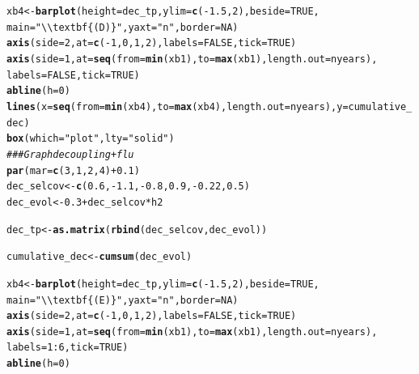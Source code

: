 \documentclass{article}\usepackage[]{graphicx}\usepackage[]{color}
\makeatletter
\newcommand{\hlnum}[1]{\textcolor[rgb]{0.686,0.059,0.569}{#1}}%
\newcommand{\hlstr}[1]{\textcolor[rgb]{0.192,0.494,0.8}{#1}}%
\newcommand{\hlcom}[1]{\textcolor[rgb]{0.678,0.584,0.686}{\textit{#1}}}%
\newcommand{\hlopt}[1]{\textcolor[rgb]{0,0,0}{#1}}%
\newcommand{\hlstd}[1]{\textcolor[rgb]{0.345,0.345,0.345}{#1}}%
\newcommand{\hlkwb}[1]{\textcolor[rgb]{0.69,0.353,0.396}{#1}}%
\newcommand{\hlkwc}[1]{\textcolor[rgb]{0.333,0.667,0.333}{#1}}%
\newcommand{\hlkwd}[1]{\textcolor[rgb]{0.737,0.353,0.396}{\textbf{#1}}}%
\newenvironment{kframe}{%
 \def\at@end@of@kframe{}%
 \ifinner\ifhmode%
  \def\at@end@of@kframe{\end{minipage}}%
  \begin{minipage}{\columnwidth}%
 \fi\fi%
 \def\FrameCommand##1{\hskip\@totalleftmargin \hskip-\fboxsep
 \colorbox{shadecolor}{##1}\hskip-\fboxsep
     \hskip-\linewidth \hskip-\@totalleftmargin \hskip\columnwidth}%
 \MakeFramed {\advance\hsize-\width
   \@totalleftmargin\z@ \linewidth\hsize
   \@setminipage}}%
 {\par\unskip\endMakeFramed%
 \at@end@of@kframe}
\newenvironment{knitrout}{}{} %
\makeatother
\begin{document}
\begin{knitrout}
\begin{kframe}
\begin{alltt}
\hlstd{xb4} \hlkwb{<-} \hlkwd{barplot}\hlstd{(}\hlkwc{height} \hlstd{= dec_tp,} \hlkwc{ylim} \hlstd{=} \hlkwd{c}\hlstd{(}\hlopt{-}\hlnum{1.5}\hlstd{,}\hlnum{2}\hlstd{),} \hlkwc{beside} \hlstd{=} \hlnum{TRUE}\hlstd{,}
               \hlkwc{main}\hlstd{=}\hlstr{"\textbackslash{}\textbackslash{}textbf\{(D)\}"}\hlstd{,} \hlkwc{yaxt}\hlstd{=}\hlstr{"n"}\hlstd{,} \hlkwc{border} \hlstd{=} \hlnum{NA}\hlstd{)}
\hlkwd{axis}\hlstd{(}\hlkwc{side}\hlstd{=}\hlnum{2}\hlstd{,} \hlkwc{at} \hlstd{=} \hlkwd{c}\hlstd{(}\hlopt{-}\hlnum{1}\hlstd{,}\hlnum{0}\hlstd{,}\hlnum{1}\hlstd{,}\hlnum{2}\hlstd{),} \hlkwc{labels} \hlstd{=} \hlnum{FALSE}\hlstd{,} \hlkwc{tick} \hlstd{=} \hlnum{TRUE}\hlstd{)}
\hlkwd{axis}\hlstd{(}\hlkwc{side}\hlstd{=}\hlnum{1}\hlstd{,} \hlkwc{at} \hlstd{=} \hlkwd{seq}\hlstd{(}\hlkwc{from}\hlstd{=}\hlkwd{min}\hlstd{(xb1),} \hlkwc{to}\hlstd{=}\hlkwd{max}\hlstd{(xb1),} \hlkwc{length.out} \hlstd{= nyears),}
     \hlkwc{labels} \hlstd{=} \hlnum{FALSE}\hlstd{,}\hlkwc{tick} \hlstd{=} \hlnum{TRUE}\hlstd{)}
\hlkwd{abline}\hlstd{(}\hlkwc{h}\hlstd{=}\hlnum{0}\hlstd{)}
\hlkwd{lines}\hlstd{(}\hlkwc{x}\hlstd{=}\hlkwd{seq}\hlstd{(}\hlkwc{from}\hlstd{=}\hlkwd{min}\hlstd{(xb4),} \hlkwc{to}\hlstd{=}\hlkwd{max}\hlstd{(xb4),} \hlkwc{length.out} \hlstd{= nyears),} \hlkwc{y}\hlstd{=cumulative_dec)}
\hlkwd{box}\hlstd{(}\hlkwc{which} \hlstd{=} \hlstr{"plot"}\hlstd{,} \hlkwc{lty} \hlstd{=} \hlstr{"solid"}\hlstd{)}
\hlcom{### Graph decoupling + flu}
\hlkwd{par}\hlstd{(}\hlkwc{mar}\hlstd{=}\hlkwd{c}\hlstd{(}\hlnum{3}\hlstd{,} \hlnum{1}\hlstd{,} \hlnum{2}\hlstd{,} \hlnum{4}\hlstd{)} \hlopt{+} \hlnum{0.1}\hlstd{)}
\hlstd{dec_selcov} \hlkwb{<-} \hlkwd{c}\hlstd{(}\hlnum{0.6}\hlstd{,}\hlopt{-}\hlnum{1.1}\hlstd{,}\hlopt{-}\hlnum{0.8}\hlstd{,}\hlnum{0.9}\hlstd{,}\hlopt{-}\hlnum{0.22}\hlstd{,}\hlnum{0.5}\hlstd{)}
\hlstd{dec_evol} \hlkwb{<-} \hlnum{0.3}\hlopt{+}\hlstd{dec_selcov} \hlopt{*} \hlstd{h2}

\hlstd{dec_tp} \hlkwb{<-} \hlkwd{as.matrix}\hlstd{(}\hlkwd{rbind}\hlstd{(dec_selcov, dec_evol))}

\hlstd{cumulative_dec} \hlkwb{<-} \hlkwd{cumsum}\hlstd{(dec_evol)}

\hlstd{xb4} \hlkwb{<-} \hlkwd{barplot}\hlstd{(}\hlkwc{height} \hlstd{= dec_tp,} \hlkwc{ylim} \hlstd{=} \hlkwd{c}\hlstd{(}\hlopt{-}\hlnum{1.5}\hlstd{,}\hlnum{2}\hlstd{),} \hlkwc{beside} \hlstd{=} \hlnum{TRUE}\hlstd{,}
               \hlkwc{main}\hlstd{=}\hlstr{"\textbackslash{}\textbackslash{}textbf\{(E)\}"}\hlstd{,} \hlkwc{yaxt}\hlstd{=}\hlstr{"n"}\hlstd{,} \hlkwc{border} \hlstd{=} \hlnum{NA}\hlstd{)}
\hlkwd{axis}\hlstd{(}\hlkwc{side}\hlstd{=}\hlnum{2}\hlstd{,} \hlkwc{at} \hlstd{=} \hlkwd{c}\hlstd{(}\hlopt{-}\hlnum{1}\hlstd{,}\hlnum{0}\hlstd{,}\hlnum{1}\hlstd{,}\hlnum{2}\hlstd{),} \hlkwc{labels} \hlstd{=} \hlnum{FALSE}\hlstd{,} \hlkwc{tick} \hlstd{=} \hlnum{TRUE}\hlstd{)}
\hlkwd{axis}\hlstd{(}\hlkwc{side}\hlstd{=}\hlnum{1}\hlstd{,} \hlkwc{at} \hlstd{=} \hlkwd{seq}\hlstd{(}\hlkwc{from}\hlstd{=}\hlkwd{min}\hlstd{(xb1),} \hlkwc{to}\hlstd{=}\hlkwd{max}\hlstd{(xb1),} \hlkwc{length.out} \hlstd{= nyears),}
     \hlkwc{labels} \hlstd{=} \hlnum{1}\hlopt{:}\hlnum{6}\hlstd{,}\hlkwc{tick} \hlstd{=} \hlnum{TRUE}\hlstd{)}
\hlkwd{abline}\hlstd{(}\hlkwc{h}\hlstd{=}\hlnum{0}\hlstd{)}


\end{alltt}
\end{kframe}
\end{knitrout}
\end{document}
